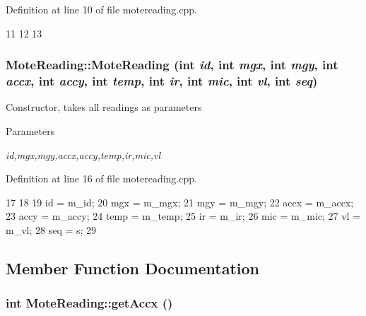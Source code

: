 Definition at line 10 of file motereading.cpp.




\begin{DoxyCode}
11 {
12 
13 }
\end{DoxyCode}


\hypertarget{classMoteReading_a1ccca01ed95b7a3091e9de29acc99350}{
\subsubsection[{MoteReading}]{\setlength{\rightskip}{0pt plus 5cm}MoteReading::MoteReading (int {\em id}, \/  int {\em mgx}, \/  int {\em mgy}, \/  int {\em accx}, \/  int {\em accy}, \/  int {\em temp}, \/  int {\em ir}, \/  int {\em mic}, \/  int {\em vl}, \/  int {\em seq})}}
\label{classMoteReading_a1ccca01ed95b7a3091e9de29acc99350}
Constructor, takes all readings as parameters 
\begin{DoxyParams}{Parameters}
\item[{\em id,mgx,mgy,accx,accy,temp,ir,mic,vl}]\end{DoxyParams}


Definition at line 16 of file motereading.cpp.




\begin{DoxyCode}
17  {
18 
19      id = m_id;
20      mgx = m_mgx;
21      mgy = m_mgy;
22      accx = m_accx;
23      accy = m_accy;
24      temp = m_temp;
25      ir = m_ir;
26      mic = m_mic;
27      vl = m_vl;
28      seq = s;
29  }
\end{DoxyCode}




\subsection{Member Function Documentation}
\hypertarget{classMoteReading_ad79a65f84dfaacc9b5c179fb66a5545f}{
\subsubsection[{getAccx}]{\setlength{\rightskip}{0pt plus 5cm}int MoteReading::getAccx ()}}
\label{classMoteReading_ad79a65f84dfaacc9b5c179fb66a5545f}


